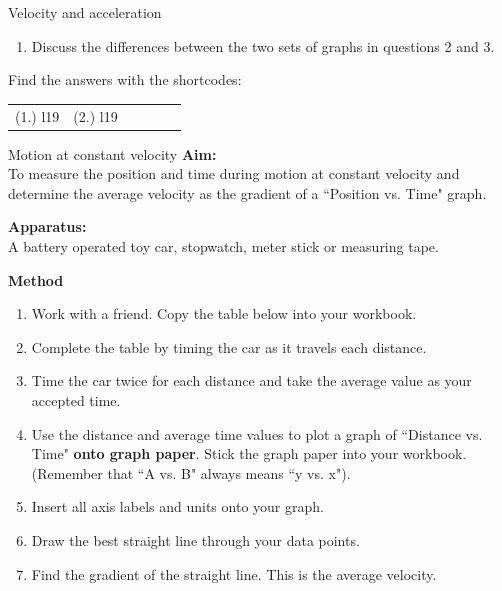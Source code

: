 \begin{exercises}{Velocity and acceleration }
\begin{enumerate}[noitemsep, label=\textbf{\arabic*}. ]
\begin{enumerate}[noitemsep, label=\textbf{\alph*}. ]
\label{m38795*uid100}\item Discuss the differences between the two sets of graphs in questions 2 and 3.\end{enumerate}
        \end{enumerate}
\label{m38795*secfhsst!!!underscore!!!id2603}
\par {} Find the answers with the shortcodes:
 \par \begin{tabular}[h]{cccccc}
 (1.) l19  &  (2.) l19  & \end{tabular}
\end{exercises}
\begin{g_experiment}{Motion at constant velocity }
            \nopagebreak
\textbf{Aim:}\\
To measure the position and time during motion at constant velocity and determine the average velocity as the gradient of a ``Position vs. Time" graph.\par 
        \label{m38795*id71286}\noindent{}\textbf{Apparatus:}\\
 A battery operated toy car, stopwatch, meter stick or measuring tape.\par 
        \label{m38795*id71301}\noindent{}\textbf{Method}\\
        \label{m38795*id71310}\begin{enumerate}[noitemsep, label=\textbf{\arabic*}. ] 
            \label{m38795*uid101}\item Work with a friend. Copy the table below into your workbook.
\label{m38795*uid102}\item Complete the table by timing the car as it travels each distance.
\label{m38795*uid103}\item Time the car twice for each distance and take the average value as your accepted time.
\label{m38795*uid104}\item Use the distance and average time values to plot a graph of ``Distance vs. Time" \textbf{onto graph paper}. Stick the graph paper into your workbook. (Remember that ``A vs. B" always means ``y vs. x").
\label{m38795*uid105}\item Insert all axis labels and units onto your graph.
\label{m38795*uid106}\item Draw the best straight line through your data points.
\label{m38795*uid107}\item Find the gradient of the straight line. This is the average velocity.

\end{enumerate}
\end{g_experiment}
